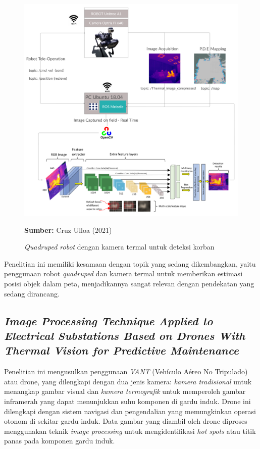 \begin{figure} [H] \centering
  \includegraphics[scale=0.057]{gambar/bab2/unitreea1.png}
  \caption{\emph{Quadruped robot} dengan kamera termal untuk deteksi korban}
  \label{fig:Quadruped  dengan kamera termal untuk deteksi korban}
  \footnotesize{\textbf{Sumber:} Cruz Ulloa (2021)}
\end{figure}

Penelitian ini memiliki kesamaan dengan topik yang sedang dikembangkan, yaitu penggunaan robot \emph{quadruped} dan kamera termal untuk memberikan estimasi posisi objek dalam peta, menjadikannya sangat relevan dengan pendekatan yang sedang dirancang.



\subsection{\emph{Image Processing Technique Applied to Electrical
Substations Based on Drones With Thermal Vision
for Predictive Maintenance}}
Penelitian ini mengusulkan penggunaan \emph{VANT} (Vehículo Aéreo No Tripulado) atau drone, yang dilengkapi dengan dua jenis kamera: \emph{kamera tradisional} untuk menangkap gambar visual dan \emph{kamera termografik} untuk memperoleh gambar inframerah yang dapat menunjukkan suhu komponen di gardu induk. Drone ini dilengkapi dengan sistem navigasi dan pengendalian yang memungkinkan operasi otonom di sekitar gardu induk. Data gambar yang diambil oleh drone diproses menggunakan teknik \emph{image processing} untuk mengidentifikasi \emph{hot spots} atau titik panas pada komponen gardu induk.

